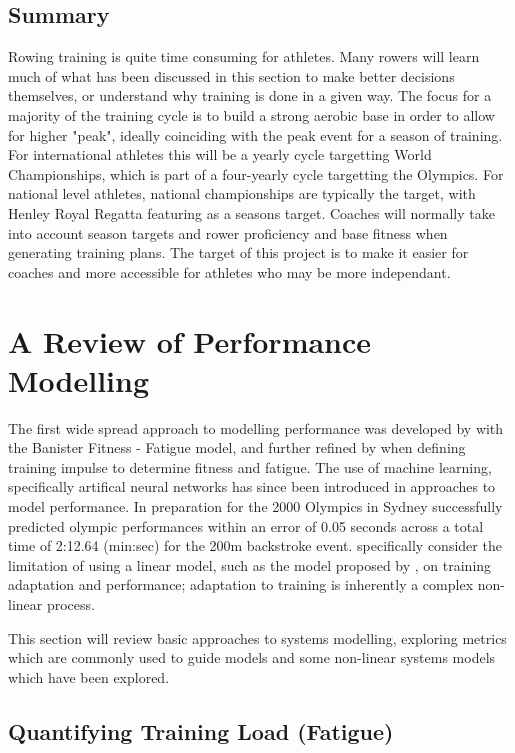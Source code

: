 \subsection{Summary}
Rowing training is quite time consuming for athletes. Many rowers will learn much of what has been discussed in this section to make better decisions themselves, or understand why training is done in a given way. The focus for a majority of the training cycle is to build a strong aerobic base in order to allow for higher "peak", ideally coinciding with the peak event for a season of training. For international athletes this will be a yearly cycle targetting World Championships, which is part of a four-yearly cycle targetting the Olympics. For national level athletes, national championships are typically the target, with Henley Royal Regatta featuring as a seasons target. Coaches will normally take into account season targets and rower proficiency and base fitness when generating training plans. The target of this project is to make it easier for coaches and more accessible for athletes who may be more independant. 

\section{A Review of Performance Modelling}
The first wide spread approach to modelling performance was developed by \textcite{Bannister1976} with the Banister Fitness - Fatigue model, and further refined by \textcite{Morton1990} when defining training impulse to determine fitness and fatigue. The use of machine learning, specifically artifical neural networks has since been introduced in approaches to model performance. In preparation for the 2000 Olympics in Sydney \textcite{Edelmannnusser2002} successfully predicted olympic performances within an error of 0.05 seconds across a total time of 2:12.64 (min:sec) for the 200m backstroke event. \textcite{Edelmannnusser2002} specifically consider the limitation of using a linear model, such as the model proposed by \textcite{Bannister1976}, on training adaptation and performance; adaptation to training is inherently a complex non-linear process. 

This section will review basic approaches to systems modelling, exploring metrics which are commonly used to guide models and some non-linear systems models which have been explored. 

\subsection{Quantifying Training Load (Fatigue)}
